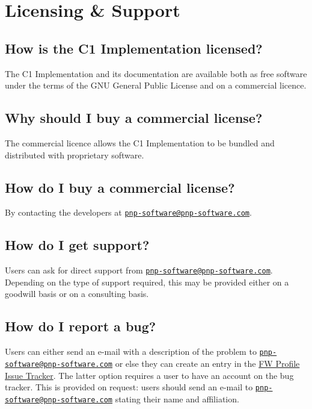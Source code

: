 \documentclass[a4paper,10pt]{article}
\let\stdsection\section
\renewcommand\section{\newpage\stdsection}
\begin{document}
\section{Licensing \& Support}\label{faq:licensing_issues}

\subsection{How is the C1 Implementation licensed?}
The C1 Implementation and its documentation are available both as free software under the terms of the GNU General Public License and on a commercial licence.

\subsection{Why should I buy a commercial license?}
The commercial licence allows the C1 Implementation to be bundled and distributed with proprietary software. 

\subsection{How do I buy a commercial license?}
By contacting the developers at \href{mailto:pnp-software@pnp-software.com}{\nolinkurl{pnp-software@pnp-software.com}}.

\subsection{How do I get support?}
Users can ask for direct support from \href{mailto:pnp-software@pnp-software.com}{\nolinkurl{pnp-software@pnp-software.com}}. Depending on the type of support required, this may be provided either on a goodwill basis or on a consulting basis.

\subsection{How do I report a bug?}
Users can either send an e-mail with a description of the problem to \href{mailto:pnp-software@pnp-software.com}{\nolinkurl{pnp-software@pnp-software.com}} 
or else they can create an entry in the \href{http://www.pnp-software.com/mantisbt-1.2.5/login_page.php}{FW Profile Issue Tracker}. 
The latter option requires a user to have an account on the bug tracker. This is provided on request: users should send an e-mail to 
\href{mailto:pnp-software@pnp-software.com}{\nolinkurl{pnp-software@pnp-software.com}} stating their name and affiliation. 
\end{document}
